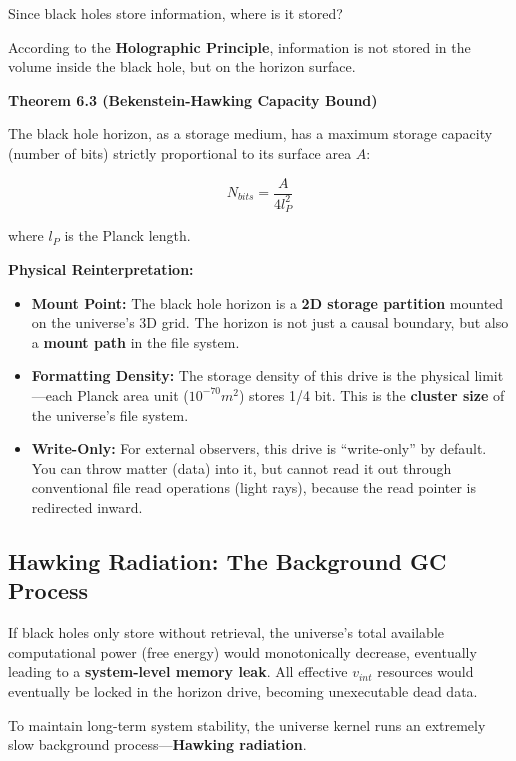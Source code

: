 Since black holes store information, where is it stored?

According to the \textbf{Holographic Principle}, information is not stored in the volume inside the black hole, but on the horizon surface.

\textbf{Theorem 6.3 (Bekenstein-Hawking Capacity Bound)}

The black hole horizon, as a storage medium, has a maximum storage capacity (number of bits) strictly proportional to its surface area \textbf{$A$}:

$$N_{bits} = \frac{A}{4 l_P^2}$$

where \textbf{$l_P$} is the Planck length.

\textbf{Physical Reinterpretation:}

\begin{itemize}
\item \textbf{Mount Point:} The black hole horizon is a \textbf{2D storage partition} mounted on the universe's 3D grid. The horizon is not just a causal boundary, but also a \textbf{mount path} in the file system.

\item \textbf{Formatting Density:} The storage density of this drive is the physical limit---each Planck area unit ($10^{-70} m^2$) stores 1/4 bit. This is the \textbf{cluster size} of the universe's file system.

\item \textbf{Write-Only:} For external observers, this drive is ``write-only'' by default. You can throw matter (data) into it, but cannot read it out through conventional file read operations (light rays), because the read pointer is redirected inward.
\end{itemize}

\subsection{Hawking Radiation: The Background GC Process}

If black holes only store without retrieval, the universe's total available computational power (free energy) would monotonically decrease, eventually leading to a \textbf{system-level memory leak}. All effective \textbf{$v_{int}$} resources would eventually be locked in the horizon drive, becoming unexecutable dead data.

To maintain long-term system stability, the universe kernel runs an extremely slow background process---\textbf{Hawking radiation}.

